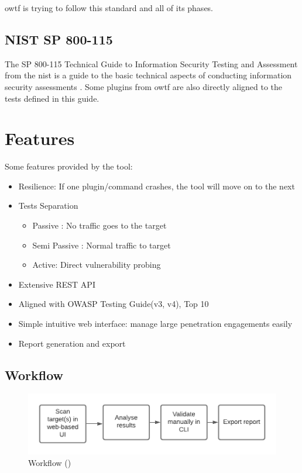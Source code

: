\ac{owtf} is trying to follow this standard and all of its phases.

\subsection{NIST SP 800-115}

The SP 800-115 Technical Guide to Information Security Testing and Assessment from the \ac{nist} is a guide to the basic technical aspects of conducting information security assessments \cite{NIST.29.06.2021}. Some plugins from \ac{owtf} are also directly aligned to the tests defined in this guide.

\section{Features}

Some features provided by the tool:

\begin{itemize}
	\item Resilience: If one plugin/command crashes, the tool will move on to the next
	\item Tests Separation
	\begin{itemize}
		\item Passive : No traffic goes to the target
		\item Semi Passive : Normal traffic to target
		\item Active: Direct vulnerability probing
	\end{itemize}
	\item Extensive REST API
	\item Aligned with OWASP Testing Guide(v3, v4), Top 10
	\item Simple intuitive web interface: manage large penetration engagements easily
	\item Report generation and export
\end{itemize}

\subsection{Workflow}

\begin{figure}[H]
	\centering
	\includegraphics[width=12cm,keepaspectratio=true]{pictures/workflow1.png}
	\caption{
		Workflow (\cite{Brennen.11.06.2021})
	}
	\label{fig:workflow1}
\end{figure}

